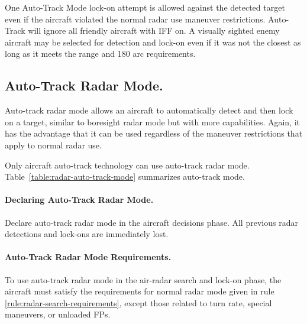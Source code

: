 \begin{advancedrules}
{One Auto-Track Mode lock-on attempt is allowed against the detected target even if the aircraft violated the normal radar use maneuver restrictions. Auto-Track will ignore all friendly aircraft with IFF on. A visually sighted enemy aircraft may be selected for detection and lock-on  even if it was not the closest as long as it meets the range and 180{\deg} arc requirements. 

}{

\subsection{Auto-Track Radar Mode.}
\label{rule:auto-track-mode} 

Auto-track radar mode allows an aircraft to automatically detect and then lock on a target, similar to boresight radar mode but with more capabilities. Again, it has the advantage that it can be used regardless of the maneuver restrictions that apply to normal radar use.

Only aircraft auto-track technology can use auto-track radar mode. Table~\ref{table:radar-auto-track-mode} summarizes auto-track mode.

\paragraph{Declaring Auto-Track Radar Mode.} Declare auto-track radar mode in the aircraft decisions phase. All previous radar detections and lock-ons are immediately lost. 

\paragraph{Auto-Track Radar Mode Requirements.} To use auto-track radar mode in the air-radar search and lock-on phase, the aircraft must satisfy the requirements for normal radar mode given in rule \ref{rule:radar-search-requirements}, except those related to turn rate, special maneuvers, or unloaded FPs.

}
\end{advancedrules}

